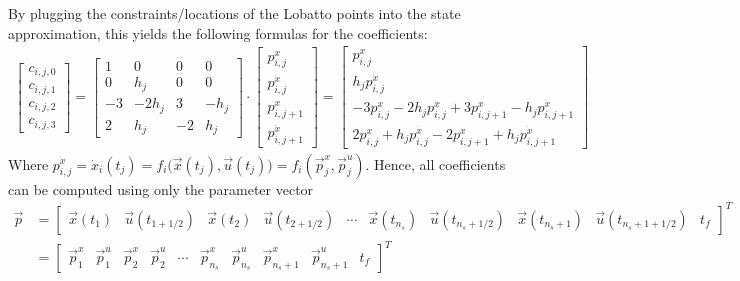 				By plugging the constraints/locations of the Lobatto points into the state approximation, this yields the following formulas for the coefficients:
				\begin{align*}
					\begin{bmatrix}
						c_{i, j, 0} \\
						c_{i, j, 1} \\
						c_{i, j, 2} \\
						c_{i, j, 3}
					\end{bmatrix}
					=
					\begin{bmatrix}
						1  & 0     & 0  & 0    \\
						0  & h_j   & 0  & 0    \\
						-3 & -2h_j & 3  & -h_j \\
						2  & h_j   & -2 & h_j
					\end{bmatrix}
					\cdot
					\begin{bmatrix}
						p_{i, j}^x         \\
						p_{i, j}^{\dot{x}} \\
						p_{i, j + 1}^{x}   \\
						p_{i, j + 1}^{\dot{x}}
					\end{bmatrix}
					=
					\begin{bmatrix}
						p_{i, j}^x                                                                                \\
						h_j p_{i, j}^{\dot{x}}                                                                    \\
						-3 p_{i, j}^x - 2h_j p_{i, j}^{\dot{x}} + 3 p_{i, j + 1}^{x} - h_j p_{i, j + 1}^{\dot{x}} \\
						2 p_{i, j}^x + h_j p_{i, j}^{\dot{x}} - 2 p_{i, j + 1}^{x} + h_j p_{i, j + 1}^{\dot{x}}
					\end{bmatrix}
				\end{align*}
				Where \( p_{i, j}^{\dot{x}} = \dot{x}_i(t_j) = f_i\big(\vec{x}(t_j), \vec{u}(t_j)\big) = f_i(\vec{p}_j^x, \vec{p}_j^u) \). Hence, all coefficients can be computed using only the parameter vector
				\begin{align*}
					\vec{p}
					 & = \begin{bmatrix} \vec{x}(t_1) & \vec{u}(t_{1 + 1/2}) & \vec{x}(t_2) & \vec{u}(t_{2 + 1/2}) & \cdots & \vec{x}(t_{n_s}) & \vec{u}(t_{n_s + 1/2}) & \vec{x}(t_{n_s + 1}) & \vec{u}(t_{n_s + 1 + 1/2}) & t_f \end{bmatrix}^T \\
					 & = \begin{bmatrix} \vec{p}_1^x & \vec{p}_1^u & \vec{p}_2^x  & \vec{p}_2^u & \cdots & \vec{p}_{n_s}^x & \vec{p}_{n_s}^u & \vec{p}_{n_s + 1}^x & \vec{p}_{n_s + 1}^u & t_f \end{bmatrix}^T
				\end{align*}
